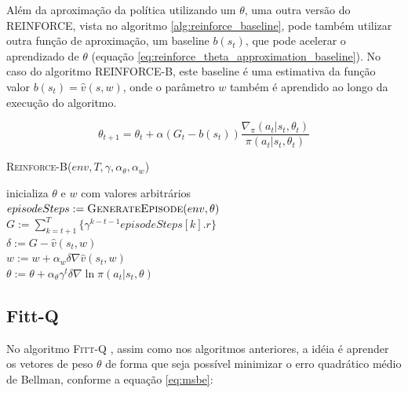 \documentclass[letterpaper]{article}
\begin{document}
Além da aproximação da política utilizando um $\theta$, uma outra versão do \textsc{REINFORCE}, vista no algoritmo \ref{alg:reinforce_baseline}, pode também utilizar outra função de aproximação, um baseline $b(s_t)$, que pode acelerar o aprendizado de $\theta$ (equação \ref{eq:reinforce_theta_approximation_baseline}). No caso do algoritmo \textsc{REINFORCE-B}, este baseline é uma estimativa da função valor $b(s_t) = \hat{v}(s, w)$, onde o parâmetro $w$ também é aprendido ao longo da execução do algoritmo.

\begin{equation}
  \label{eq:reinforce_theta_approximation_baseline}
  \theta_{t+1} = \theta_t + \alpha (G_t - b(s_t)) \frac{\nabla_{\pi}(a_t|s_t, \theta_t)}{\pi(a_t|s_t, \theta_t)} 
\end{equation}

\linesnumbered
\dontprintsemicolon
\begin{algorithm}[t!]
{
	\caption{\textsc{Reinforce-B}($ env, T, \gamma, \alpha_{\theta}, \alpha_{w} $)}
	\label{alg:reinforce_baseline}
    inicializa $ \theta $ e $ w $ com valores arbitrários \\

    {
      $episodeSteps := \textsc{GenerateEpisode}(env, \theta)$\\

      {
        $G := \sum_{k = t+1}^T \{ \gamma^{k-t-1} episodeSteps[k].r \}$\\
        $ \delta := G - \hat{v}(s_t, w) $\\
        $ w := w + \alpha_w \delta \nabla \hat{v}(s_t, w) $\\
        $ \theta := \theta + \alpha_{\theta} \gamma^t \delta \nabla \ln \pi(a_t|s_t, \theta) $
      }
    }
}
\end{algorithm}

\subsection{Fitt-Q}

No algoritmo \textsc{Fitt-Q} \cite{Riedmiller-2005}, assim como nos algoritmos anteriores, a idéia é aprender os vetores de peso $\theta$ de forma que seja possível minimizar o erro quadrático médio de Bellman, conforme a equação \ref{eq:msbe}:
\end{document}
